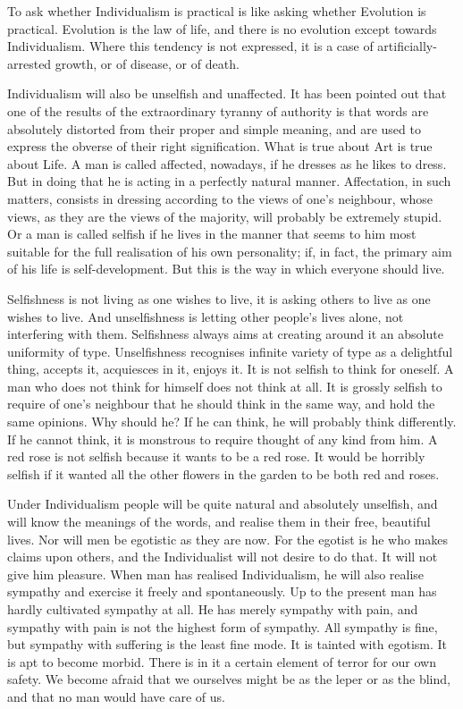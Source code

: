 To ask whether Individualism is practical is like asking whether Evolution is practical. Evolution is the law of life, and there is no evolution except towards Individualism. Where this tendency is not expressed, it is a case of artificially-arrested growth, or of disease, or of death.\par

Individualism will also be unselfish and unaffected. It has been pointed out that one of the results of the extraordinary tyranny of authority is that words are absolutely distorted from their proper and simple meaning, and are used to express the obverse of their right signification. What is true about Art is true about Life. A man is called affected, nowadays, if he dresses as he likes to dress. But in doing that he is acting in a perfectly natural manner. Affectation, in such matters, consists in dressing according to the views of one’s neighbour, whose views, as they are the views of the majority, will probably be extremely stupid. Or a man is called selfish if he lives in the manner that seems to him most suitable for the full realisation of his own personality; if, in fact, the primary aim of his life is self-development. But this is the way in which everyone should live.\par

Selfishness is not living as one wishes to live, it is asking others to live as one wishes to live. And unselfishness is letting other people’s lives alone, not interfering with them. Selfishness always aims at creating around it an absolute uniformity of type. Unselfishness recognises infinite variety of type as a delightful thing, accepts it, acquiesces in it, enjoys it. It is not selfish to think for oneself. A man who does not think for himself does not think at all. It is grossly selfish to require of one’s neighbour that he should think in the same way, and hold the same opinions. Why should he? If he can think, he will probably think differently. If he cannot think, it is monstrous to require thought of any kind from him. A red rose is not selfish because it wants to be a red rose. It would be horribly selfish if it wanted all the other flowers in the garden to be both red and roses.\par

Under Individualism people will be quite natural and absolutely unselfish, and will know the meanings of the words, and realise them in their free, beautiful lives. Nor will men be egotistic as they are now. For the egotist is he who makes claims upon others, and the Individualist will not desire to do that. It will not give him pleasure. When man has realised Individualism, he will also realise sympathy and exercise it freely and spontaneously. Up to the present man has hardly cultivated sympathy at all. He has merely sympathy with pain, and sympathy with pain is not the highest form of sympathy. All sympathy is fine, but sympathy with suffering is the least fine mode. It is tainted with egotism. It is apt to become morbid. There is in it a certain element of terror for our own safety. We become afraid that we ourselves might be as the leper or as the blind, and that no man would have care of us.\par

